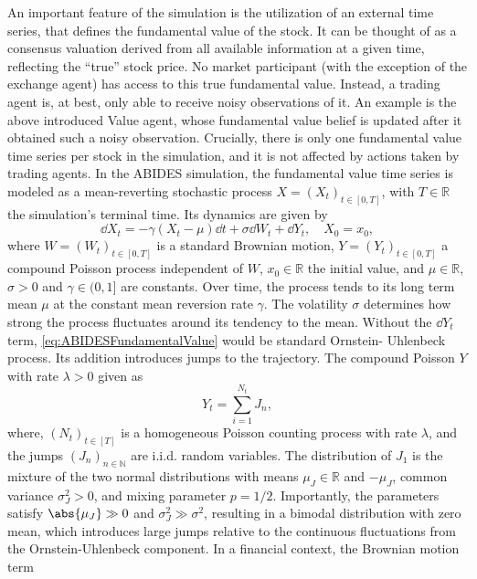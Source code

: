 \documentclass[
    a4paper,
    11pt,
    bibliography=totoc,
    listof=totoc,      
    headinclude=true,
    cleardoublepage=empty,
]{scrbook}
\theoremstyle{plain}
\theoremstyle{definition}
\theoremstyle{remark}
\newcommand{\SetR}{\mathbb R}
\newcommand{\SetN}{\mathbb N}
\begin{document}
An important feature of the simulation is the utilization of an external time 
series, that defines the fundamental value of the stock. It can be thought of
as a consensus valuation derived from all available information at a given time,
reflecting the ``true'' stock price. No market participant (with the exception
of the exchange agent) has access to this true fundamental value. Instead,
a trading agent is, at best, only able to receive noisy observations of it. An
example is the above introduced Value agent, whose fundamental value belief is
updated after it obtained such a noisy observation. Crucially, there is only
one fundamental value time series per stock in the simulation, and it is not
affected by actions taken by trading agents. In the ABIDES simulation, the
fundamental value time series is modeled as a mean-reverting stochastic 
process $X=(X_t)_{t \in [0,T]}$, with $T\in\SetR$ the simulation's terminal
time. Its dynamics are given by
\begin{equation}
\label{eq:ABIDESFundamentalValue}
    \dd{X}_t = -\gamma (X_t - \mu) \dd{t} + \sigma \dd{W_t} + \dd{Y}_t,
    \quad X_0 = x_0,
\end{equation}
where $W=(W_t)_{t\in[0,T]}$ is a standard Brownian motion, $Y = (Y_t)_{t \in
[0,T]}$ a compound Poisson process independent of $W$, $x_0\in\SetR$ the
initial value, and $\mu\in\SetR$, $\sigma>0$ and $\gamma\in (0,1]$ are
constants. Over time, the process tends to its long term mean $\mu$ at the
constant mean reversion rate $\gamma$. The volatility $\sigma$ determines how 
strong the process fluctuates around its tendency to the mean. Without the 
$\dd{Y_t}$ term, \cref{eq:ABIDESFundamentalValue} would be standard Ornstein-%
Uhlenbeck process. Its addition introduces jumps to the trajectory. The compound Poisson $Y$ with rate $\lambda>0$ 
given as
\begin{equation}
\label{eq:CompoundPoisson}
    Y_t = \sum_{i=1}^{N_t} J_n,
\end{equation}
where, $(N_t)_{t\in[T]}$ is a homogeneous Poisson counting process with rate 
$\lambda$, and the jumps $(J_n)_{n\in\SetN}$ are i.i.d. random variables. The
distribution of $J_1$ is the mixture of the two normal distributions with means
$\mu_J\in\SetR$ and $-\mu_J$, common variance $\sigma_J^2 >0$, and mixing
parameter $p=1/2$. Importantly, the parameters satisfy $\abs{\mu_J} \gg 0$ and 
$\sigma_J^2 \gg \sigma^2$, resulting in a bimodal distribution with zero mean,
which introduces large jumps relative to the continuous fluctuations from the
Ornstein-Uhlenbeck component. In a financial context, the Brownian motion term 
\end{document}
